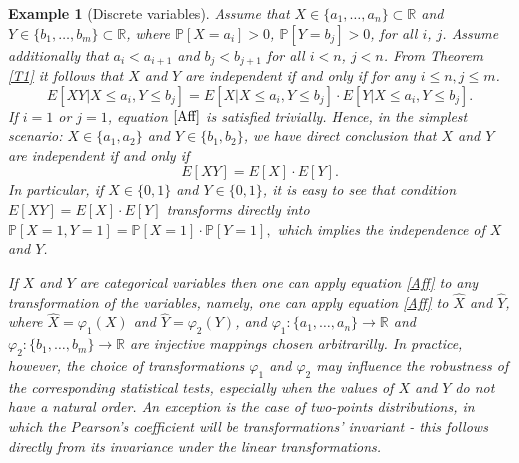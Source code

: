 \documentclass[sn-mathphys,Numbered,11pt]{sn-jnl}%
\theoremstyle{thmstyleone}%
\newtheorem{example}{Example}}
\newcommand{\R}{\mathbb{R}}
\newcommand{\PP}{\mathbb{P}}
\begin{document}
\begin{example}[Discrete variables] Assume that $X\in\{a_1,\dots,a_n\}\subset\R$ and $Y\in\{b_1,\dots,b_m\}\subset\R$, where $\PP[X=a_i]>0$, $\PP[Y=b_j]>0$, for all $i$, $j$. Assume additionally that $a_i<a_{i+1}$ and $b_j<b_{j+1}$ for all $i<n$, $j<n$. From Theorem \ref{T1} it follows that $X$ and $Y$ are independent if and only if for any  $i\leq n, j\leq m$.
\begin{equation}\label{Aff}
E[XY| X\leq a_i, Y\leq b_j]=E[X| X\leq a_i, Y\leq b_j]\cdot E[Y| X\leq a_i, Y\leq b_j].
\end{equation}
If $i=1$ or $j=1$, equation $\eqref{Aff}$ is satisfied trivially. Hence, in the simplest scenario: $X\in\{a_1,a_2\}$ and $Y\in\{b_1,b_2\}$, we have direct conclusion that $X$ and $Y$ are independent if and only if 
\begin{equation}\label{exy}
E[XY]=E[X]\cdot E[Y].
\end{equation}
In particular, if  $X\in\{0,1\}$ and $Y\in\{0,1\}$, it is easy to see that condition $E[XY]=E[X]\cdot E[Y]$  transforms directly into $\PP[X=1,Y=1]=\PP[X=1]\cdot\PP[Y=1],$ which implies the independence of $X$ and $Y$.

 If  $X$ and $Y$ are categorical variables then one can apply equation \eqref{Aff} to any  transformation of the variables, namely, one can apply equation \eqref{Aff} to $\hat{X}$ and $\hat{Y}$, where $\hat{X}=\varphi_1(X)$ and $\hat{Y}=\varphi_2(Y)$, and  $\varphi_1\colon\{a_1,\dots,a_n\}\to\R$ and  $\varphi_2\colon\{b_1,\dots,b_m\}\to\R$ are injective mappings chosen arbitrarilly. In practice, however, the choice of transformations $\varphi_1$ and $\varphi_2$ may influence the robustness of the corresponding statistical tests, especially when the values of $X$ and $Y$ do not have a natural order. An exception is the case of two-points distributions, in which the Pearson's coefficient will be transformations' invariant - this follows directly from its invariance under the linear transformations.
\end{example}
\end{document}
